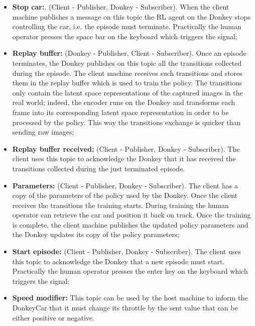 \begin{itemize}
    \item \textbf{Stop car:}. (Client - Publisher, Donkey - Subscriber). When the client machine publishes a message on this topic the RL agent on the Donkey stops controlling the car, i.e. the episode must terminate. Practically the human operator presses the space bar on the keyboard which triggers the signal;
    \item \textbf{Replay buffer:} (Donkey - Publisher, Client - Subscriber). Once an episode terminates, the Donkey publishes on this topic all the transitions collected during the episode. The client machine receives such transitions and stores them in the replay buffer which is used to train the policy. The transitions only contain the latent space representations of the captured images in the real world; indeed, the encoder runs on the Donkey and transforms each frame into its corresponding latent space representation in order to be processed by the policy. This way the transitions exchange is quicker than sending raw images;
    \item \textbf{Replay buffer received:} (Client - Publisher, Donkey - Subscriber). The client uses this topic to acknowledge the Donkey that it has received the transitions collected during the just terminated episode. 
    \item \textbf{Parameters:} (Client - Publisher, Donkey - Subscriber). The client has a copy of the parameters of the policy used by the Donkey. Once the client receives the transitions the training starts. During training the human operator can retrieve the car and position it back on track. Once the training is complete, the client machine publishes the updated policy parameters and the Donkey updates its copy of the policy parameters;
    \item \textbf{Start episode:} (Client - Publisher, Donkey - Subscriber). The client uses this topic to acknowledge the Donkey that a new episode must start. Practically the human operator presses the enter key on the keyboard which triggers the signal;
    \item \textbf{Speed modifier:} This topic can be used by the host machine to inform the DonkeyCar that it must change its throttle by the sent value that can be either positive or negative. 
\end{itemize}

